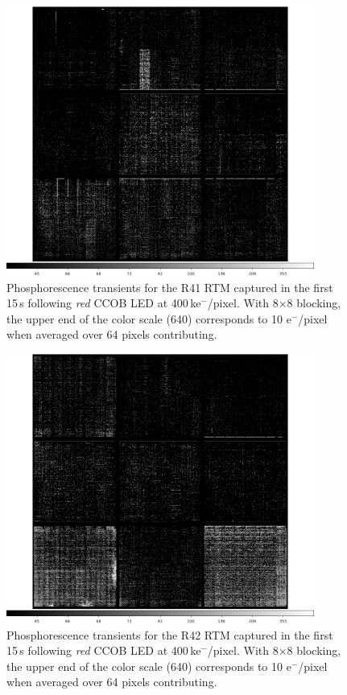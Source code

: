 \begin{figure}[!htbp]
\centering
\includegraphics[width=0.9\textwidth]{figures/phosphorescence-survey/itl_fluor_R41_0-19_rb1_log.png}
\caption{Phosphorescence transients for the R41 RTM captured in the first 15\,s following {\it red} CCOB LED at 400\,ke$^-$/pixel. With 8$\times$8 blocking, the upper end of the color scale (640) corresponds to 10 e$^-$/pixel when averaged over 64 pixels contributing.}
\label{fig:phos:R41}
\end{figure}

\begin{figure}[!htbp]
\centering
\includegraphics[width=0.9\textwidth]{figures/phosphorescence-survey/itl_fluor_R42_0-19_rb1_log.png}
\caption{Phosphorescence transients for the R42 RTM captured in the first 15\,s following {\it red} CCOB LED at 400\,ke$^-$/pixel. With 8$\times$8 blocking, the upper end of the color scale (640) corresponds to 10 e$^-$/pixel when averaged over 64 pixels contributing.}
\label{fig:phos:R42}
\end{figure}

